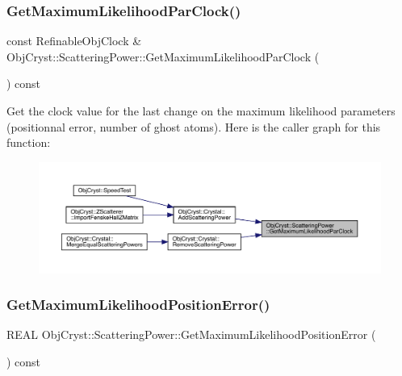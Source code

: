 \subsubsection{\texorpdfstring{GetMaximumLikelihoodParClock()}{GetMaximumLikelihoodParClock()}}
{\footnotesize\ttfamily const Refinable\+Obj\+Clock \& Obj\+Cryst\+::\+Scattering\+Power\+::\+Get\+Maximum\+Likelihood\+Par\+Clock (\begin{DoxyParamCaption}{ }\end{DoxyParamCaption}) const}

Get the clock value for the last change on the maximum likelihood parameters (positionnal error, number of ghost atoms). Here is the caller graph for this function\+:
\nopagebreak
\begin{figure}[H]
\begin{center}
\leavevmode
\includegraphics[width=350pt]{class_obj_cryst_1_1_scattering_power_a831505bd54282ec723e694f38e934ada_icgraph}
\end{center}
\end{figure}
\mbox{\label{class_obj_cryst_1_1_scattering_power_ae5d793cc7bb07b5aae0a8dc3c322ba6d}} 
\subsubsection{\texorpdfstring{GetMaximumLikelihoodPositionError()}{GetMaximumLikelihoodPositionError()}}
{\footnotesize\ttfamily R\+E\+AL Obj\+Cryst\+::\+Scattering\+Power\+::\+Get\+Maximum\+Likelihood\+Position\+Error (\begin{DoxyParamCaption}{ }\end{DoxyParamCaption}) const}

